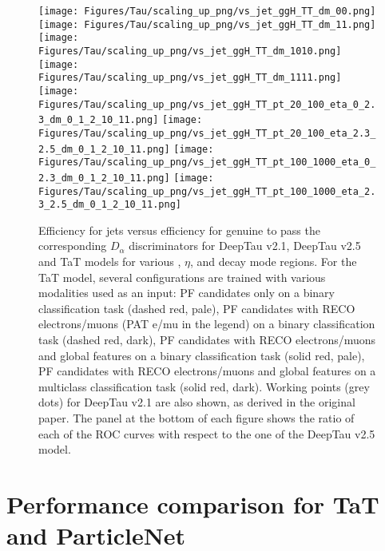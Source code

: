 \begin{figure}[H]
    \centering
    \texttt{[image: Figures/Tau/scaling\_up\_png/vs\_jet\_ggH\_TT\_dm\_00.png]}
    \texttt{[image: Figures/Tau/scaling\_up\_png/vs\_jet\_ggH\_TT\_dm\_11.png]}
    \texttt{[image: Figures/Tau/scaling\_up\_png/vs\_jet\_ggH\_TT\_dm\_1010.png]}
    \texttt{[image: Figures/Tau/scaling\_up\_png/vs\_jet\_ggH\_TT\_dm\_1111.png]}
    \texttt{[image: Figures/Tau/scaling\_up\_png/vs\_jet\_ggH\_TT\_pt\_20\_100\_eta\_0\_2.3\_dm\_0\_1\_2\_10\_11.png]}
    \texttt{[image: Figures/Tau/scaling\_up\_png/vs\_jet\_ggH\_TT\_pt\_20\_100\_eta\_2.3\_2.5\_dm\_0\_1\_2\_10\_11.png]}
    \texttt{[image: Figures/Tau/scaling\_up\_png/vs\_jet\_ggH\_TT\_pt\_100\_1000\_eta\_0\_2.3\_dm\_0\_1\_2\_10\_11.png]}
    \texttt{[image: Figures/Tau/scaling\_up\_png/vs\_jet\_ggH\_TT\_pt\_100\_1000\_eta\_2.3\_2.5\_dm\_0\_1\_2\_10\_11.png]}
    \caption{Efficiency for jets versus efficiency for genuine \tauh to pass the corresponding $D_\alpha$ discriminators for DeepTau v2.1, DeepTau v2.5 and TaT models for various \pt, $\eta$, and \tauh decay mode regions. For the TaT model, several configurations are trained with various modalities used as an input: PF candidates only on a binary classification task (dashed red, pale), PF candidates with RECO electrons/muons (PAT e/mu in the legend) on a binary classification task (dashed red, dark), PF candidates with RECO electrons/muons and global features on a binary classification task (solid red, pale), PF candidates with RECO electrons/muons and global features on a multiclass classification task (solid red, dark). Working points (grey dots) for DeepTau v2.1 are also shown, as derived in the original paper. The panel at the bottom of each figure shows the ratio of each of the ROC curves with respect to the one of the DeepTau v2.5 model.}
\end{figure}

\newpage
\section{Performance comparison for TaT and ParticleNet}\label{app:tat-bench}

